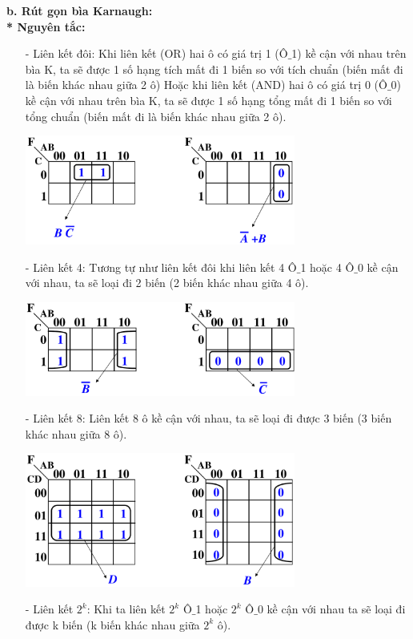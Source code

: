 \textbf{b. Rút gọn bìa Karnaugh:}\\
\textbf{* Nguyên tắc:}
\begin{itemize}
    \item[-] Liên kết đôi: Khi liên kết (OR) hai ô có giá trị 1 (Ô$\_$1) kề cận với nhau trên bìa K, ta sẽ được 1 số hạng tích mất đi 1 biến so với tích chuẩn (biến mất đi là biến khác nhau giữa 2 ô) Hoặc khi liên kết (AND) hai ô có giá trị 0 (Ô$\_$0) kề cận với nhau trên bìa K, ta sẽ được 1 số hạng tổng mất đi 1 biến so với tổng chuẩn (biến mất đi là biến khác nhau giữa 2 ô).
    \begin{center}
        \includegraphics[width = 0.7\textwidth]{./local/image/32.png}
    \end{center}    
    \item[-] Liên kết 4: Tương tự như liên kết đôi khi liên kết 4 Ô$\_$1 hoặc 4 Ô$\_$0 kề cận với nhau, ta sẽ loại đi 2 biến (2 biến khác nhau giữa 4 ô).
    \begin{center}
        \includegraphics[width = 0.7\textwidth]{./local/image/33.png}
    \end{center}
    \item[-] Liên kết 8: Liên kết 8 ô kề cận với nhau, ta sẽ loại đi được 3 biến (3 biến khác nhau giữa 8 ô).
    \begin{center}
        \includegraphics[width = 0.7\textwidth]{./local/image/34.png}
    \end{center}
    \item[-] Liên kết $2^k$: Khi ta liên kết $2^k$ Ô$\_$1 hoặc $2^k$ Ô$\_$0 kề cận với nhau ta sẽ loại đi được k biến (k biến khác nhau giữa $2^k$ ô).
\end{itemize}
